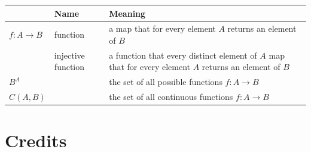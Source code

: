 \documentclass[11pt,letterpaper,fleqn]{memoir} %
\begin{document}
\begin{tabular}{p{} p{} p{}}
	& Name & Meaning  \\ 
	\hline 
	$f : A \to B$ & function & a map that for every element $A$ returns an element of $B$ \\ 
	\hline 
	& injective function & a function that every distinct element of $A$ map that for every element $A$ returns an element of $B$ \\ 
	\hline 
	$B^A$ &  & the set of all possible functions $f : A \to B$  \\ 
	\hline 
	$C(A,B)$ & & the set of all continuous functions $f : A \to B$  \\ 
	\hline 
		
\end{tabular} 


\backmatter

\chapter[Credits]{\centering Credits}
\end{document}
